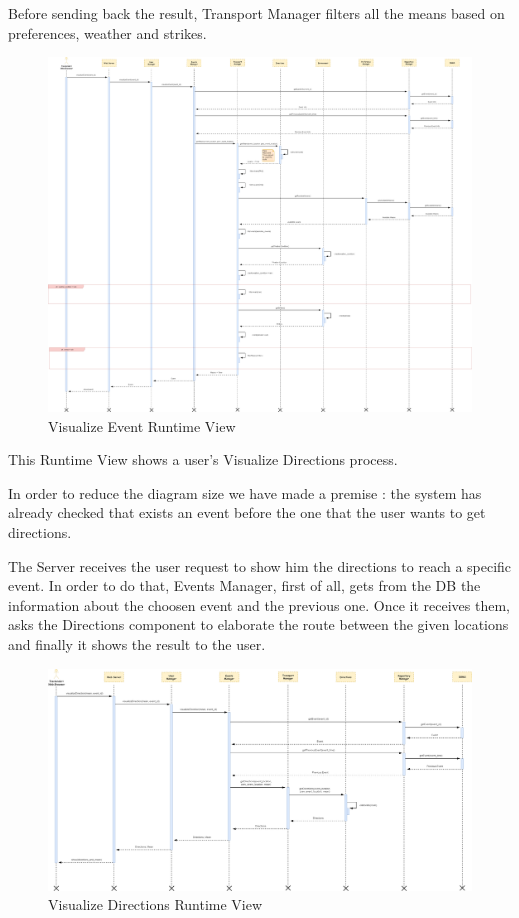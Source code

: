 Before sending back the result, Transport Manager filters all the means based on preferences, weather and strikes.
\begin{figure}[H]
	\centering
	\includegraphics[scale=0.125]{Images/Runtime/Visualize_Event}
	\caption{Visualize Event Runtime View}
\end{figure}

\newpage
{}
This Runtime View shows a user's Visualize Directions process.\par
In order to reduce the diagram size we have made a premise : the system has already checked that exists an event before the one that the user wants to get directions.\par
The Server receives the user request to show him the directions to reach a specific event. In order to do that, Events Manager, first of all, gets from the DB the information about the choosen event and the previous one. Once it receives them, asks the Directions component to elaborate the route between the given locations and finally it shows the result to the user.
\begin{figure}[H]
	\centering
	\includegraphics[scale=0.16]{Images/Runtime/Visualize_Directions}
	\caption{Visualize Directions Runtime View}
\end{figure}

